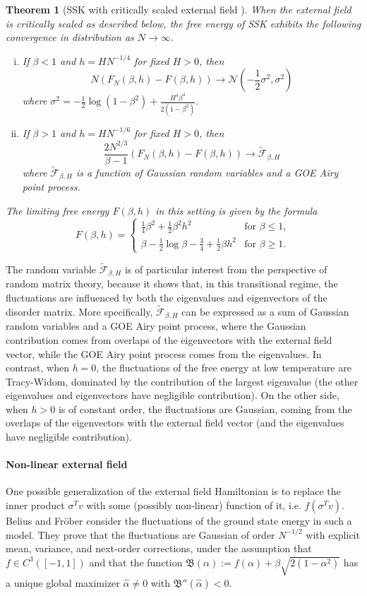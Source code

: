 \documentclass[11pt]{article}
\numberwithin{equation}{section}
\newcommand{\beq}{ \begin{equation} }
\newcommand{\eeq}{ \end{equation} }
\def \a {\alpha}
\def \b {\beta}
\def \s {\sigma}
\newcommand{\cF}{\mathcal{F}}
\def \cF {\mathcal{F}}
\def \cN {\mathcal{N}}
\newtheorem{theorem}{Theorem}[section]
\theoremstyle{remark}
\begin{document}
\begin{theorem}[SSK with critically scaled external field \cite{Baiketal21,landon2020fluctuations}] 
When the external field is critically scaled as described below, the free energy of SSK exhibits the following convergence in distribution as $N\to\infty$.
\begin{enumerate}[(i)]
\item If $\b<1$ and $h=HN^{-1/4}$ for fixed $H>0$, then
\beq
N(F_N(\b,h)-F(\b,h))\to\cN(-\frac12 \s^2,\s^2)
\eeq
where $\s^2=-\frac12\log(1-\b^2)+\frac{H^4\b^4}{2(1-\b^2)}$.

\item If $\b>1$ and $h=HN^{-1/6}$ for fixed $H>0$, then
\beq
\frac{2N^{2/3}}{\b-1}(F_N(\b,h)-F(\b,h))\to \tilde{\cF}_{\b,H}
\eeq
where $\tilde{\cF}_{\b,H}$ is a function of Gaussian random variables and a GOE Airy point process.
\end{enumerate} 
The limiting free energy $F(\b,h)$ in this setting is given by the formula
\beq
F(\b,h)=\begin{cases}
\frac14\b^2+\frac12\b^2h^2& \text{for }\b\leq1,\\
\b-\frac12\log\b-\frac34+\frac12\b h^2 & \text{for }\b\geq1.
\end{cases}
\eeq
\end{theorem}
The random variable $\tilde{\cF}_{\b,H}$ is of particular interest from the perspective of random matrix theory, because it shows that, in this transitional regime, the fluctuations are influenced by both the eigenvalues and eigenvectors of the disorder matrix. More specifically, $\tilde{\cF}_{\b,H}$ can be expressed as a sum of Gaussian random variables and a GOE Airy point process, where the Gaussian contribution comes from overlaps of the eigenvectors with the external field vector, while the GOE Airy point process comes from the eigenvalues.  In contrast, when $h=0$, the fluctuations of the free energy at low temperature are Tracy-Widom, dominated by the contribution of the largest eigenvalue (the other eigenvalues and eigenvectors have negligible contribution).  On the other side, when $h>0$ is of constant order, the fluctuations are Gaussian, coming from the overlaps of the eigenvectors with the external field vector (and the eigenvalues have negligible contribution).

\paragraph{Non-linear external field} One possible generalization of the external field Hamiltonian is to replace the inner product $\sigma^Tv$ with some (possibly non-linear) function of it, i.e. $f(\sigma^Tv)$.  Belius and Fr\"{o}ber \cite{beliusfrober} consider the fluctuations of the ground state energy in such a model.  They prove that the fluctuations are Gaussian of order $N^{-1/2}$ with explicit mean, variance, and next-order corrections, under the assumption that $f\in C^3([-1,1])$ and that the function $\mathfrak{B}(\a):=f(\a)+\b\sqrt{2(1-\a^2)}$ has a unique global maximizer $\hat{\a}\neq0$ with $\mathfrak{B}''(\hat{\a})<0$.
\end{document}
